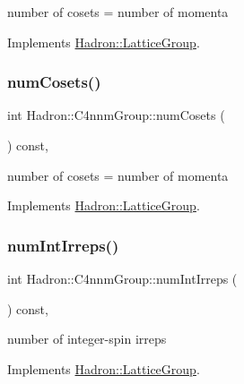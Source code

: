 number of cosets = number of momenta 

Implements \mbox{\hyperlink{structHadron_1_1LatticeGroup_afc76430f36a3a041f86d4058c59bf55e}{Hadron\+::\+Lattice\+Group}}.

\mbox{\label{structHadron_1_1C4nnmGroup_a38cf4c54a4dff0a3c056aa3a1dc4dca2}} 
\subsubsection{\texorpdfstring{numCosets()}{numCosets()}\hspace{0.1cm}{\footnotesize\ttfamily [2/2]}}
{\footnotesize\ttfamily int Hadron\+::\+C4nnm\+Group\+::num\+Cosets (\begin{DoxyParamCaption}{ }\end{DoxyParamCaption}) const\hspace{0.3cm}{\ttfamily [inline]}, {\ttfamily [virtual]}}

number of cosets = number of momenta 

Implements \mbox{\hyperlink{structHadron_1_1LatticeGroup_afc76430f36a3a041f86d4058c59bf55e}{Hadron\+::\+Lattice\+Group}}.

\mbox{\label{structHadron_1_1C4nnmGroup_afc1f011462142b5aa3ddab6e5824d365}} 
\subsubsection{\texorpdfstring{numIntIrreps()}{numIntIrreps()}\hspace{0.1cm}{\footnotesize\ttfamily [1/2]}}
{\footnotesize\ttfamily int Hadron\+::\+C4nnm\+Group\+::num\+Int\+Irreps (\begin{DoxyParamCaption}{ }\end{DoxyParamCaption}) const\hspace{0.3cm}{\ttfamily [inline]}, {\ttfamily [virtual]}}

number of integer-\/spin irreps 

Implements \mbox{\hyperlink{structHadron_1_1LatticeGroup_af2aa7b39222bf188389356eefcef7547}{Hadron\+::\+Lattice\+Group}}.


